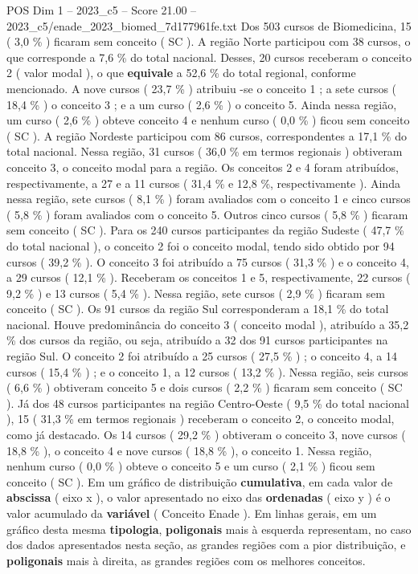 \begin{textsample}{POS Dim 1 – 2023\_c5 – Score 21.00 – 2023\_c5/enade\_2023\_biomed\_7d177961fe.txt}
Dos 503 cursos de Biomedicina, 15 ( 3,0 \% ) ficaram sem conceito ( SC ).
A região Norte participou com 38 cursos, o que corresponde a 7,6 \% do total nacional.
Desses, 20 cursos receberam o conceito 2 ( valor modal ), o que \textbf{equivale} a 52,6 \% do total regional, conforme mencionado.
A nove cursos ( 23,7 \% ) atribuiu -se o conceito 1 ; a sete cursos ( 18,4 \% ) o conceito 3 ; e a um curso ( 2,6 \% ) o conceito 5.
Ainda nessa região, um curso ( 2,6 \% ) obteve conceito 4 e nenhum curso ( 0,0 \% ) ficou sem conceito ( SC ).
A região Nordeste participou com 86 cursos, correspondentes a 17,1 \% do total nacional.
Nessa região, 31 cursos ( 36,0 \% em termos regionais ) obtiveram conceito 3, o conceito modal para a região.
Os conceitos 2 e 4 foram atribuídos, respectivamente, a 27 e a 11 cursos ( 31,4 \% e 12,8 \%, respectivamente ).
Ainda nessa região, sete cursos ( 8,1 \% ) foram avaliados com o conceito 1 e cinco cursos ( 5,8 \% ) foram avaliados com o conceito 5.
Outros cinco cursos ( 5,8 \% ) ficaram sem conceito ( SC ).
Para os 240 cursos participantes da região Sudeste ( 47,7 \% do total nacional ), o conceito 2 foi o conceito modal, tendo sido obtido por 94 cursos ( 39,2 \% ).
O conceito 3 foi atribuído a 75 cursos ( 31,3 \% ) e o conceito 4, a 29 cursos ( 12,1 \% ).
Receberam os conceitos 1 e 5, respectivamente, 22 cursos ( 9,2 \% ) e 13 cursos ( 5,4 \% ).
Nessa região, sete cursos ( 2,9 \% ) ficaram sem conceito ( SC ).
Os 91 cursos da região Sul corresponderam a 18,1 \% do total nacional.
Houve predominância do conceito 3 ( conceito modal ), atribuído a 35,2 \% dos cursos da região, ou seja, atribuído a 32 dos 91 cursos participantes na região Sul.
O conceito 2 foi atribuído a 25 cursos ( 27,5 \% ) ; o conceito 4, a 14 cursos ( 15,4 \% ) ; e o conceito 1, a 12 cursos ( 13,2 \% ).
Nessa região, seis cursos ( 6,6 \% ) obtiveram conceito 5 e dois cursos ( 2,2 \% ) ficaram sem conceito ( SC ).
Já dos 48 cursos participantes na região Centro-Oeste ( 9,5 \% do total nacional ), 15 ( 31,3 \% em termos regionais ) receberam o conceito 2, o conceito modal, como já destacado.
Os 14 cursos ( 29,2 \% ) obtiveram o conceito 3, nove cursos ( 18,8 \% ), o conceito 4 e nove cursos ( 18,8 \% ), o conceito 1.
Nessa região, nenhum curso ( 0,0 \% ) obteve o conceito 5 e um curso ( 2,1 \% ) ficou sem conceito ( SC ).
Em um gráfico de distribuição \textbf{cumulativa}, em cada valor de \textbf{abscissa} ( eixo x ), o valor apresentado no eixo das \textbf{ordenadas} ( eixo y ) é o valor acumulado da \textbf{variável} ( Conceito Enade ).
Em linhas gerais, em um gráfico desta mesma \textbf{tipologia}, \textbf{poligonais} mais à esquerda representam, no caso dos dados apresentados nesta seção, as grandes regiões com a pior distribuição, e \textbf{poligonais} mais à direita, as grandes regiões com os melhores conceitos.

\end{textsample}
